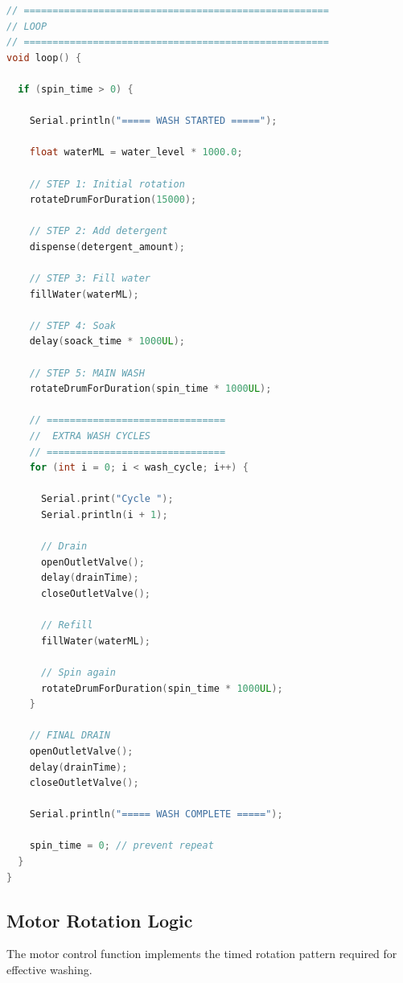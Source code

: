 \begin{lstlisting}[language=C++, caption=Complete Arduino Firmware, label=lst:arduino_full]
// =====================================================
// LOOP
// =====================================================
void loop() {

  if (spin_time > 0) {

    Serial.println("===== WASH STARTED =====");

    float waterML = water_level * 1000.0;

    // STEP 1: Initial rotation
    rotateDrumForDuration(15000);

    // STEP 2: Add detergent
    dispense(detergent_amount);

    // STEP 3: Fill water
    fillWater(waterML);

    // STEP 4: Soak
    delay(soack_time * 1000UL);

    // STEP 5: MAIN WASH
    rotateDrumForDuration(spin_time * 1000UL);

    // ===============================
    //  EXTRA WASH CYCLES
    // ===============================
    for (int i = 0; i < wash_cycle; i++) {

      Serial.print("Cycle ");
      Serial.println(i + 1);

      // Drain
      openOutletValve();
      delay(drainTime);
      closeOutletValve();

      // Refill
      fillWater(waterML);

      // Spin again
      rotateDrumForDuration(spin_time * 1000UL);
    }

    // FINAL DRAIN
    openOutletValve();
    delay(drainTime);
    closeOutletValve();

    Serial.println("===== WASH COMPLETE =====");

    spin_time = 0; // prevent repeat
  }
}
\end{lstlisting}


\subsection{Motor Rotation Logic}
The motor control function implements the timed rotation pattern required for effective washing.

